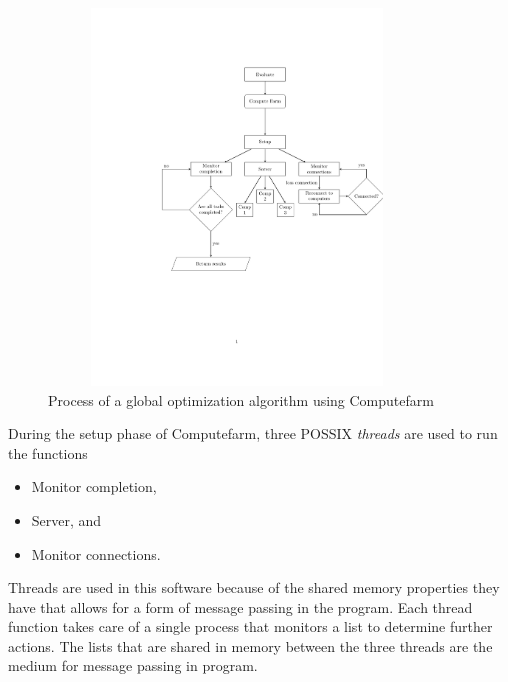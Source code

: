 \begin{figure}[h!]
    \centering
    \includegraphics[width=10cm,height=10cm]{chapters/chapter_3_Software/flowchart2.pdf}
    \caption{Process of a global optimization algorithm using Computefarm}
    \label{fig:implementation}
\end{figure}

During the setup phase of Computefarm, three POSSIX \textit{threads} are used to run the functions
\begin{itemize}
    \item Monitor completion,
    \item Server, and
    \item Monitor connections. 
\end{itemize}

Threads are used in this software because of the shared memory properties they have that allows for a form of message passing in the program. Each thread function takes care of a single process that monitors a list to determine further actions. The lists that are shared in memory between the three threads are the medium for message passing in program. 

